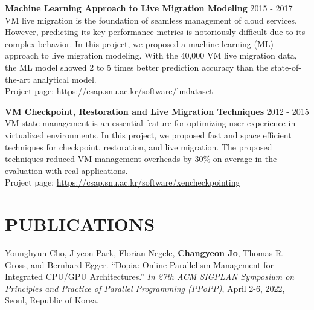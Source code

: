 \documentclass[margin]{res}
\begin{document}
\begin{resume}
\vspace{-0.5em}
\par
\textbf{Machine Learning Approach to Live Migration Modeling} \hfill 2015 - 2017 \\
VM live migration is the foundation of seamless management of cloud services.
However, predicting its key performance metrics is notoriously difficult due
to its complex behavior. In this project, we proposed a machine learning (ML)
approach to live migration modeling. With the 40,000 VM live migration data,
the ML model showed 2 to 5 times better prediction accuracy than
the state-of-the-art analytical model.
\\
Project page: \href{https://csap.snu.ac.kr/software/lmdataset}{https://csap.snu.ac.kr/software/lmdataset}

\vspace{-0.5em}
\par
\textbf{VM Checkpoint, Restoration and Live Migration Techniques} \hfill 2012 - 2015 \\
VM state management is an essential feature for optimizing user experience in
virtualized environments. In this project, we proposed fast and space efficient
techniques for checkpoint, restoration, and live migration.
The proposed techniques reduced VM management overheads by 30\% on average
in the evaluation with real applications. \\
Project page: \href{https://csap.snu.ac.kr/software/xencheckpointing}{https://csap.snu.ac.kr/software/xencheckpointing}



\section{PUBLICATIONS}
Younghyun Cho, Jiyeon Park, Florian Negele, \textbf{Changyeon Jo}, Thomas R. Gross, and Bernhard Egger. ``Dopia: Online Parallelism Management for Integrated CPU/GPU Architectures.'' \textit{In 27th ACM SIGPLAN Symposium on Principles and Practice of Parallel Programming (PPoPP)}, April 2-6, 2022, Seoul, Republic of Korea.


\end{resume}
\end{document}
